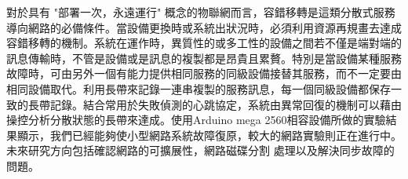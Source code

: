 \begin{abstractCH}

\setlength{\baselineskip}{1.5em}

對於具有 "部署一次，永遠運行" 概念的物聯網而言，容錯移轉是這類分散式服務導向網路的必備條件。當設備更換時或系統出狀況時，必須利用資源再規畫去達成容錯移轉的機制。系統在運作時，異質性的或多工性的設備之間若不僅是端對端的訊息傳輸時，不管是設備或是訊息的複製都是昂貴且累贅。特別是當設備某種服務故障時，可由另外一個有能力提供相同服務的同級設備接替其服務，而不一定要由相同設備取代。利用長帶來記錄一連串複製的服務訊息，每一個同級設備都保存一致的長帶記錄。結合常用於失敗偵測的心跳協定，系統由異常回復的機制可以藉由操控分析分散狀態的長帶來達成。使用Arduino mega 2560相容設備所做的實驗結果顯示，我們已經能夠使小型網路系統故障復原，較大的網路實驗則正在進行中。未來研究方向包括確認網路的可擴展性，網路磁碟分割 處理以及解決同步故障的問題。

\end{abstractCH}
